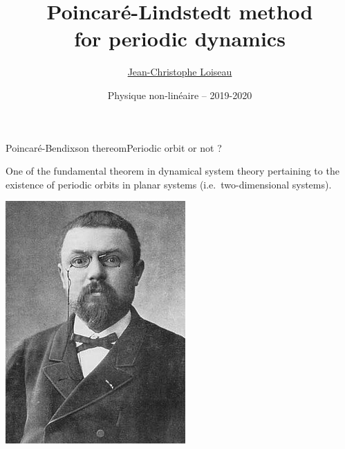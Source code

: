\documentclass[usenames,dvipsnames,svgnames,10pt,aspectratio=169]{beamer}
\title[Nonlinear physics] %
{
	Poincaré-Lindstedt method \\
  for periodic dynamics
}
\author[J.-Ch.~Loiseau] %
{
	\underline{Jean-Christophe Loiseau}
}
\institute[unused]
{
	\url{jean-christophe.loiseau@ensam.eu} \\
	Laboratoire DynFluid \\
	Arts et M\'etiers, France.
}
\date[unused]{Physique non-lin\'eaire -- 2019-2020}
\begin{document}
\titleframe	%


\begin{frame}[t, c]{Poincaré-Bendixson thereom}{Periodic orbit or not ?}
  \begin{minipage}{.68\textwidth}
    One of the fundamental theorem in dynamical system theory pertaining to the existence of periodic orbits in planar systems (i.e.\ two-dimensional systems).
  \end{minipage}%
  \hfill
  \begin{minipage}{.28\textwidth}
    \centering
    \includegraphics[width=\textwidth]{poincare}
  \end{minipage}

  \vspace{1cm}
\end{frame}
\end{document}
